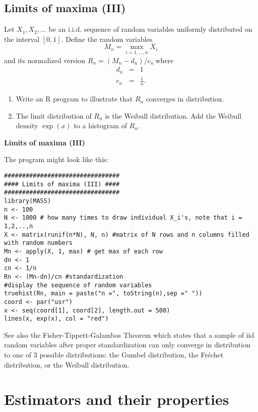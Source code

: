 \documentclass{article}
\begin{document}
\subsection{Limits of maxima (III)}

Let $X_{1},X_{2},\ldots $ be an i.i.d. sequence of random variables
uniformly distributed on the interval $[0,1]$. Define the random variables%
\begin{equation*}
M_{n}=\max_{i=1,\ldots ,n}X_{i}
\end{equation*}%
and its normalized version $R_{n}=(M_{n}-d_{n})/c_{n}\ $where
\begin{eqnarray*}
d_{n} &=&1 \\
c_{n} &=&\frac{1}{n}.
\end{eqnarray*}

\begin{enumerate}
\item Write an R program to illustrate that $R_{n}$ converges in
distribution.

\item The limit distribution of $R_{n}$ is the Weibull distribution. Add the
Weibull density $\exp \left( x\right) $ to a histogram of $R_{n}$.
\end{enumerate}

\begin{solution}
\textbf{Limits of maxima (III)}

The program might look like this:
\begin{verbatim}
################################
#### Limits of maxima (III) ####
################################
library(MASS)
n <- 100
N <- 1000 # how many times to draw individual X_i's, note that i = 1,2,..,n
X <- matrix(runif(n*N), N, n) #matrix of N rows and n columns filled with random numbers
Mn <- apply(X, 1, max) # get max of each row
dn <- 1
cn <- 1/n
Rn <- (Mn-dn)/cn #standardization
#display the sequence of random variables
truehist(Rn, main = paste("n =", toString(n),sep =" "))
coord <- par("usr")
x <- seq(coord[1], coord[2], length.out = 500)
lines(x, exp(x), col = "red")
\end{verbatim}
See also the Fisher-Tippett-Galambos Theorem which states that a sample of iid random variables after proper standardization can only converge in distribution to one of 3 possible distributions: the Gumbel distribution, the Fréchet distribution, or the Weibull distribution.
\end{solution}

\newpage
\section{Estimators and their properties\label{estimators}}
\end{document}
